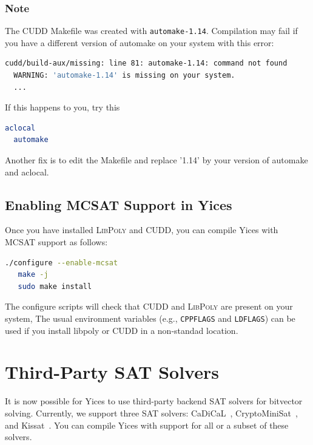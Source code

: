 \documentclass[11pt,twoside,fleqn,openright,titlepage]{cslreport}
\begin{document}
\subsubsection*{Note}
The CUDD Makefile was created with \texttt{automake-1.14}. Compilation may fail if you
have a different version of automake on your system with this error:
\begin{small}
\begin{lstlisting}[language=sh]
  cudd/build-aux/missing: line 81: automake-1.14: command not found
  WARNING: 'automake-1.14' is missing on your system.
  ...
\end{lstlisting}
\end{small}
If this happens to you, try this
\begin{small}
\begin{lstlisting}[language=sh]
  aclocal
  automake
\end{lstlisting}
\end{small}
Another fix is to edit the Makefile and replace '1.14' by your version of automake and aclocal.


\subsection*{Enabling MCSAT Support in Yices}
Once you have installed \textsc{LibPoly} and CUDD, you can compile Yices with MCSAT
support as follows:
\begin{small}
\begin{lstlisting}[language=sh]
   ./configure --enable-mcsat
   make -j
   sudo make install
\end{lstlisting}
\end{small}
The configure scripts will check that CUDD and \textsc{LibPoly} are present on your system,
The usual environment variables (e.g., \texttt{CPPFLAGS} and
\texttt{LDFLAGS}) can be used if you install libpoly or CUDD in a non-standad
location.

\section{Third-Party SAT Solvers}

It is now possible for Yices to use third-party backend SAT solvers
for bitvector solving. Currently, we support three SAT solvers:
CaDiCaL~\cite{Biere:cadical:2019},
CryptoMiniSat~\cite{Soos+etal:extending:2009}, and
Kissat~\cite{BiereFazekasFleuryHeisinger-SAT-Competition-2020-solvers}.
You can compile Yices with support for all or a subset of these
solvers.
\end{document}
